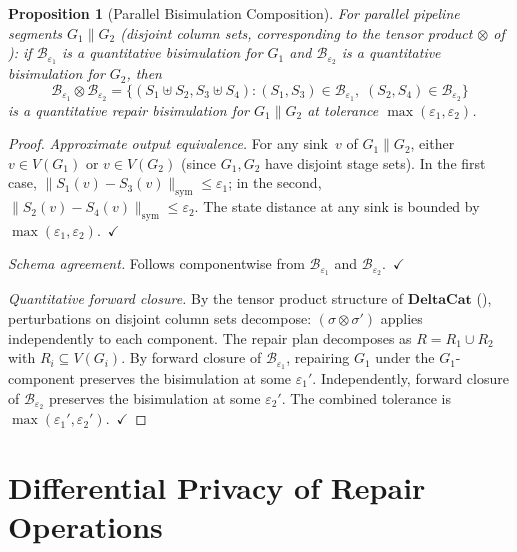 \documentclass[11pt,a4paper]{article}
\newtheorem{proposition}[theorem]{Proposition}
\theoremstyle{definition}
\begin{document}
\begin{proposition}[Parallel Bisimulation Composition]\label{prop:parallel-bisim}
For parallel pipeline segments $G_1 \parallel G_2$ (disjoint column sets,
corresponding to the tensor product $\otimes$ of ):
if $\mathcal{B}_{\varepsilon_1}$ is a quantitative bisimulation for $G_1$ and
$\mathcal{B}_{\varepsilon_2}$ is a quantitative bisimulation for $G_2$, then
\[
  \mathcal{B}_{\varepsilon_1} \otimes \mathcal{B}_{\varepsilon_2}
  = \{(S_1 \uplus S_2, S_3 \uplus S_4) :
    (S_1, S_3) \in \mathcal{B}_{\varepsilon_1},\;
    (S_2, S_4) \in \mathcal{B}_{\varepsilon_2}\}
\]
is a quantitative repair bisimulation for $G_1 \parallel G_2$ at tolerance
$\max(\varepsilon_1, \varepsilon_2)$.
\end{proposition}

\begin{proof}
\emph{Approximate output equivalence.}
For any sink~$v$ of $G_1 \parallel G_2$, either $v \in V(G_1)$ or
$v \in V(G_2)$ (since $G_1, G_2$ have disjoint stage sets).  In the first
case, $\|S_1(v) - S_3(v)\|_{\mathrm{sym}} \leq \varepsilon_1$; in the second,
$\|S_2(v) - S_4(v)\|_{\mathrm{sym}} \leq \varepsilon_2$.  The state distance
at any sink is bounded by $\max(\varepsilon_1, \varepsilon_2)$.~$\checkmark$

\emph{Schema agreement.}
Follows componentwise from $\mathcal{B}_{\varepsilon_1}$ and
$\mathcal{B}_{\varepsilon_2}$.~$\checkmark$

\emph{Quantitative forward closure.}
By the tensor product structure of $\mathbf{DeltaCat}$
(), perturbations on disjoint column sets decompose:
$(\sigma \otimes \sigma')$ applies independently to each component.
The repair plan decomposes as $R = R_1 \cup R_2$ with $R_i \subseteq V(G_i)$.
By forward closure of $\mathcal{B}_{\varepsilon_1}$, repairing $G_1$ under
the $G_1$-component preserves the bisimulation at some $\varepsilon_1'$.
Independently, forward closure of $\mathcal{B}_{\varepsilon_2}$ preserves
the bisimulation at some $\varepsilon_2'$.  The combined tolerance is
$\max(\varepsilon_1', \varepsilon_2')$.~$\checkmark$
\end{proof}


\section{Differential Privacy of Repair Operations}
\label{sec:dp-repair}
\end{document}

